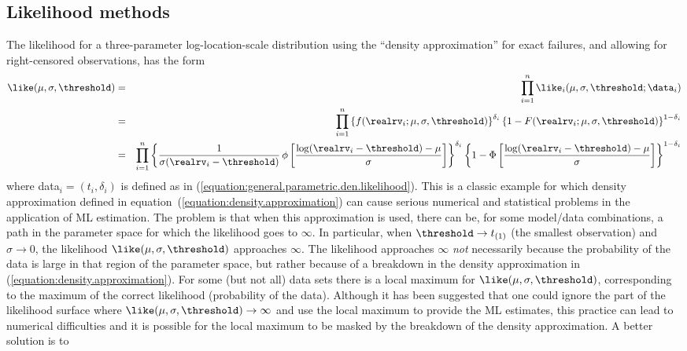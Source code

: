 \subsection{Likelihood methods}
\label{section:like.methods}
The likelihood for a three-parameter log-location-scale distribution
using the ``density approximation'' for exact failures, and allowing
for right-censored observations, has the form
\begin{eqnarray*}
\like(\mu,\sigma,\threshold) &=& \prod_{i=1}^{n} 
\like_{i}(\mu, \sigma,\threshold;\data_{i}) \\
&=&
  \prod_{i=1}^{n}    
 \left\{ 
 f(\realrv_{i};\mu,\sigma,\threshold)
\right\}^{\delta_{i}} 
\left\{1- F(\realrv_{i};\mu,\sigma,\threshold) \right\}^{1-\delta_{i}}
\\
&=&  \prod_{i=1}^{n}
\left\{ \frac{1}{\sigma (\realrv_{i}-\threshold)} \, \phi
\left[\frac{ \log(\realrv_{i}-\threshold) -\mu}{\sigma}
\right]
\right\}^{\delta_{i}}
\left\{1- \Phi \left[\frac{ \log(\realrv_{i}-\threshold) -\mu}{\sigma}
\right] \right\}^{1-\delta_{i}} 
\end{eqnarray*}
where data$_{i}=(t_{i}, \delta_{i})$ is defined as in
(\ref{equation:general.parametric.den.likelihood}).  This is a
classic example for which density approximation defined in
equation~(\ref{equation:density.approximation}) can cause serious
numerical and statistical problems in the application of ML
estimation. The problem is that when this approximation is used,
there can be, for some model/data combinations, a path in the
parameter space for which the likelihood goes to $\infty$.  In
particular, when $\threshold \rightarrow t_{(1)}$ (the smallest
observation) and $\sigma \rightarrow 0$, the likelihood
$\like(\mu,\sigma,\threshold)$ approaches $\infty$.  The likelihood
approaches $\infty$ {\em not} necessarily because the probability of
the data is large in that region of the parameter space, but rather
because of a breakdown in the density approximation in
(\ref{equation:density.approximation}).  For some (but not all) data
sets there is a local maximum for $\like(\mu,\sigma,\threshold)$,
corresponding to the maximum of the correct likelihood (probability
of the data).  Although it has been suggested that one could ignore
the part of the likelihood surface where
$\like(\mu,\sigma,\threshold) \rightarrow
\infty$
and use the local maximum to provide the ML estimates, this practice
can lead to numerical difficulties and it is possible for the local
maximum to be masked by the breakdown of the density approximation. 
A better solution is to 
